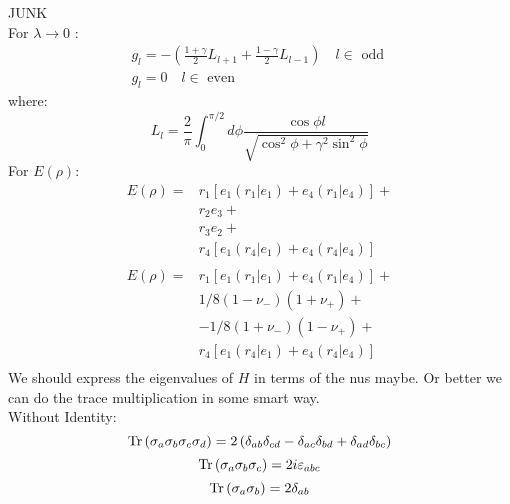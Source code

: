 \documentclass[12pt,a4paper]{book}
\theoremstyle{definition}
\begin{document}
	JUNK \\
	

	For $\lambda \rightarrow 0 $ : 
	\begin{equation}
		\begin{array}{l}
			g_{l}=-\left(\frac{1+\gamma}{2} L_{l+1}+\frac{1-\gamma}{2} L_{l-1}\right) \quad l \in \text { odd } \\
			g_{l}=0 \quad l \in \text { even }
		\end{array}
	\end{equation}
	where:
	\begin{equation}
		L_{l}=\frac{2}{\pi} \int_{0}^{\pi / 2} d \phi \frac{\cos \phi l}{\sqrt{\cos ^{2} \phi+\gamma^{2} \sin ^{2} \phi}}
	\end{equation}
For $E(\rho)$:
\begin{equation}
	\begin{aligned}
		E(\rho)=&r_1 [e_1(r_1|e_1)+e_4(r_1|e_4)] +\\
		&r_2 e_3 +\\
		&r_3 e_2 + \\
		&r_4 [e_1(r_4|e_1)+e_4(r_4|e_4)] \\
	\end{aligned}
\end{equation}
\begin{equation}
	\begin{aligned}
		E(\rho)=&r_1 [e_1(r_1|e_1)+e_4(r_1|e_4)] +\\
		&1/8(1-\nu_-)(1+\nu_+)+\\
		&-1/8(1+\nu_-)(1-\nu_+)+ \\
		&r_4 [e_1(r_4|e_1)+e_4(r_4|e_4)] \\
	\end{aligned}
\end{equation}
We should express the eigenvalues of $H$ in terms of the nus maybe.
Or better we can do the trace multiplication in some smart way.\\

Without Identity:
\begin{equation}
	\Tr \left(\sigma_{a} \sigma_{b} \sigma_{c} \sigma_{d}\right)=2\left(\delta_{a b} \delta_{c d}-\delta_{a c} \delta_{b d}+\delta_{a d} \delta_{b c}\right)
\end{equation}
\begin{equation}
	\Tr\left(\sigma_{a} \sigma_{b} \sigma_{c}\right)=2 i \varepsilon_{a b c}
\end{equation}
\begin{equation}
	\Tr\left(\sigma_{a} \sigma_{b}\right)=2 \delta_{a b}
\end{equation}
\end{document}
